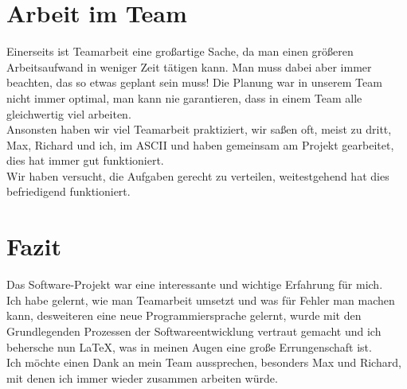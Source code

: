 \documentclass[a4paper]{scrreprt}
\begin{document}
\section{Arbeit im Team}

Einerseits ist Teamarbeit eine großartige Sache, da man einen größeren Arbeitsaufwand in weniger Zeit tätigen kann. Man muss dabei aber immer beachten, das so etwas geplant sein muss! Die Planung war in unserem Team nicht immer optimal, man kann nie garantieren, dass in einem Team alle gleichwertig viel arbeiten.\\
Ansonsten haben wir viel Teamarbeit praktiziert, wir saßen oft, meist zu dritt, Max, Richard und ich, im ASCII und haben gemeinsam am Projekt gearbeitet, dies hat immer gut funktioniert.\\
Wir haben versucht, die Aufgaben gerecht zu verteilen, weitestgehend hat dies befriedigend funktioniert.\\

\section{Fazit}

Das Software-Projekt war eine interessante und wichtige Erfahrung für mich.\\ 
Ich habe gelernt, wie man Teamarbeit umsetzt und was für Fehler man machen kann, desweiteren eine neue Programmiersprache gelernt, wurde mit den Grundlegenden Prozessen der Softwareentwicklung vertraut gemacht und ich behersche nun LaTeX, was in meinen Augen eine große Errungenschaft ist.\\
Ich möchte einen Dank an mein Team aussprechen, besonders Max und Richard, mit denen ich immer wieder zusammen arbeiten würde.\\
\end{document}
